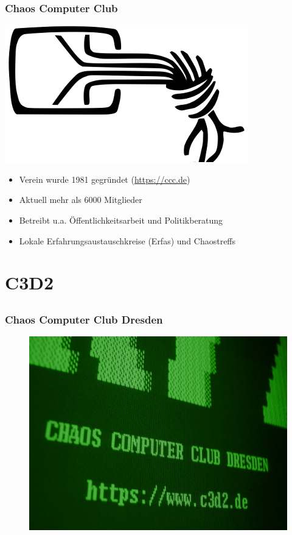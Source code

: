 \documentclass[12pt]{beamer}
\begin{document}
\begin{frame}
	\frametitle{Chaos Computer Club}
	\begin{center}
		\includegraphics[height=0.2\textheight]{img/chaosknoten.png}
	\end{center}	
	\begin{itemize}
		\item<1-> Verein wurde 1981 gegründet (\url{https://ccc.de})          
		\item<2-> Aktuell mehr als 6000 Mitglieder
		\item<3-> Betreibt u.a. Öffentlichkeitsarbeit und Politikberatung      
		\item<4-> Lokale Erfahrungsaustauschkreise (Erfas) und Chaostreffs
	\end{itemize}
\end{frame}



\section{C3D2}
\subsection{}

\begin{frame}
	\frametitle{Chaos Computer Club Dresden}
	\begin{figure}
		\includegraphics[height=0.7\textheight]{img/c3d2_green.jpg}
    \end{figure}
\end{frame}
\end{document}

